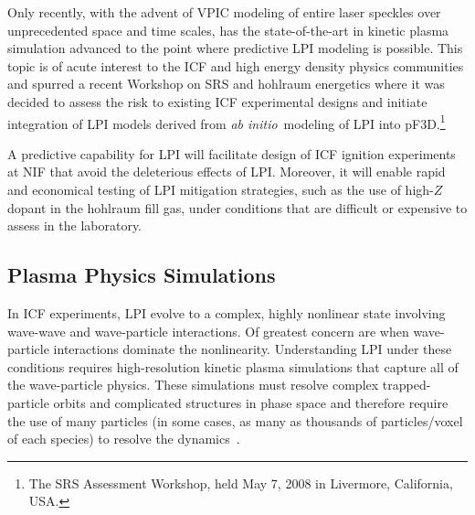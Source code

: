 \documentclass[journal,twoside]{IEEEtran}
\newcommand{\abinitio} {\textit{ab initio}}
\begin{document}
Only recently, with the advent of VPIC modeling of entire laser
speckles over unprecedented space and time scales, has the
state-of-the-art in kinetic plasma simulation advanced to the point
where predictive LPI modeling is possible.  This topic is of acute
interest to the ICF and high energy density physics communities and
spurred a recent Workshop on SRS and hohlraum energetics where it was
decided to assess the risk to existing ICF experimental designs and
initiate integration of LPI models derived from \abinitio\ modeling of
LPI into pF3D.\footnote{The SRS Assessment Workshop, held May 7, 2008
in Livermore, California, USA.}

A predictive capability for LPI will facilitate design of ICF ignition
experiments at NIF that avoid the deleterious effects of LPI.
Moreover, it will enable rapid and economical testing of LPI
mitigation strategies, such as the use of high-$Z$ dopant in the
hohlraum fill gas, under conditions that are difficult or expensive to
assess in the laboratory.

\subsection{Plasma Physics Simulations}

In ICF experiments, LPI evolve to a complex, highly nonlinear state
involving wave-wave and wave-particle interactions.  Of greatest
concern are when wave-particle interactions dominate the nonlinearity.
Understanding LPI under these conditions requires high-resolution
kinetic plasma simulations that capture all of the wave-particle
physics.  These simulations must resolve complex trapped-particle
orbits and complicated structures in phase space and therefore require
the use of many particles (in some cases, as many as thousands of
particles/voxel of each species) to resolve the
dynamics~\cite{Yin_et_al_Phys_Plasmas_2006}.
\end{document}
